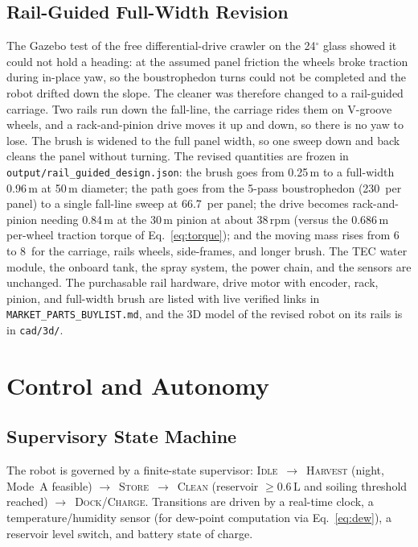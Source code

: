 \documentclass[12pt,a4paper]{report}
\newcommand{\ang}[1]{#1\ensuremath{^{\circ}}}
\newcommand{\SI}[2]{#1\,\mbox{#2}}
\newcommand{\meter}{m}\newcommand{\metre}{m}
\newcommand{\liter}{L}\newcommand{\litre}{L}
\newcommand{\rpm}{rpm}
\begin{document}
\section{Rail-Guided Full-Width Revision}
\label{sec:railrev}
The Gazebo test of the free differential-drive crawler on the \ang{24} glass
showed it could not hold a heading: at the assumed panel friction the wheels
broke traction during in-place yaw, so the boustrophedon turns could not be
completed and the robot drifted down the slope. The cleaner was therefore
changed to a rail-guided carriage. Two rails run down the fall-line, the
carriage rides them on V-groove wheels, and a rack-and-pinion drive moves it
up and down, so there is no yaw to lose. The brush is widened to the full
panel width, so one sweep down and back cleans the panel without turning. The
revised quantities are frozen in \texttt{output/rail\_guided\_design.json}:
the brush goes from \SI{0.25}{\meter} to a full-width \SI{0.96}{\meter} at
\SI{50}{\milli\meter} diameter; the path goes from the 5-pass boustrophedon
(\SI{230}{\second} per panel) to a single fall-line sweep at
\SI{66.7}{\second} per panel; the drive becomes rack-and-pinion needing
\SI{0.84}{\newton\meter} at the \SI{30}{\milli\meter} pinion at about
\SI{38}{\rpm} (versus the \SI{0.686}{\newton\meter} per-wheel traction torque
of Eq.~\eqref{eq:torque}); and the moving mass rises from \SI{6}{\kilogram} to
\SI{8}{\kilogram} for the carriage, rails wheels, side-frames, and longer
brush. The TEC water module, the onboard tank, the spray system, the
power chain, and the sensors are unchanged. The purchasable rail hardware,
drive motor with encoder, rack, pinion, and full-width brush are listed with
live verified links in \texttt{MARKET\_PARTS\_BUYLIST.md}, and the 3D model of
the revised robot on its rails is in \texttt{cad/3d/}.

\chapter{Control and Autonomy}
\label{ch:control}

\section{Supervisory State Machine}
The robot is governed by a finite-state supervisor:
\textsc{Idle}~$\rightarrow$~\textsc{Harvest} (night, Mode~A feasible)
$\rightarrow$~\textsc{Store}~$\rightarrow$~\textsc{Clean} (reservoir
$\ge\SI{0.6}{\liter}$ and soiling threshold reached)
$\rightarrow$~\textsc{Dock/Charge}. Transitions are driven by a real-time clock,
a temperature/humidity sensor (for dew-point computation via
Eq.~\eqref{eq:dew}), a reservoir level switch, and battery state of charge.
\end{document}
